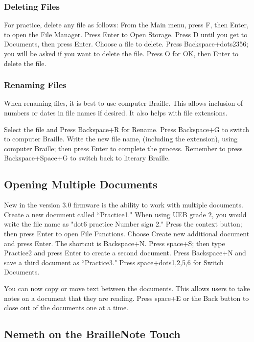 \documentclass[10pt,letterpaper,twoside]{report}
\begin{document}
{{{\subsubsection{Deleting Files}

For practice, delete any file as follows:
From the Main menu, press F, then Enter, to open the File Manager.
Press Enter to Open Storage.
Press D until you get to Documents, then press Enter.
Choose a file to delete.
Press Backspace+dots2356; you will be asked if you want to delete the file.
Press O for OK, then Enter to delete the file.

\subsubsection{Renaming Files}

When renaming files, it is best to use computer Braille. This allows inclusion of numbers or dates in file names if desired. It also helps with file extensions.

Select the file and Press Backspace+R for Rename.
Press Backspace+G to switch to computer Braille.
Write the new file name, (including the extension), using computer Braille; then press Enter to complete the process.
Remember to press Backspace+Space+G to switch back to literary Braille.

\subsection{Opening Multiple Documents}

New in the version 3.0 firmware is the ability to work with multiple documents.
Create a new document called ``Practice1." When using UEB grade 2, you would write the file name as "dot6 practice Number sign 2."
Press the context button; then press Enter to open File Functions.
Choose Create new additional document and press Enter. The shortcut is Backspace+N.
Press space+S; then type Practice2 and press Enter to create a second document.
Press Backspace+N and save a third document as ``Practice3."
Press space+dots1,2,5,6 for Switch Documents.

You can now copy or move text between the documents. This allows users to take notes on a document that they are reading.
Press space+E or the Back button to close out of the documents one at a time.

\subsection{Nemeth on the BrailleNote Touch}

}}}
\end{document}
